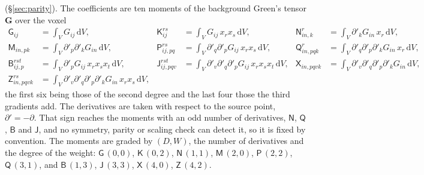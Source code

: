 \documentclass[11pt,a4paper]{article}
\newcommand{\bG}{\mathbf{G}}
\newcommand{\dd}{\mathrm{d}}
\begin{document}
(\S\ref{sec:parity}). The coefficients are ten moments of the background Green's tensor $\bG$ over
the voxel
\begin{equation}\label{eq:moments}
\begin{aligned}
\mathsf G_{ij}&=\int_V G_{ij}\,\dd V, &
\mathsf K^{rs}_{ij}&=\int_V G_{ij}\,x_rx_s\,\dd V, &
\mathsf N^{r}_{in,k}&=\int_V \partial'_kG_{in}\,x_r\,\dd V,\\
\mathsf M_{in,pk}&=\int_V \partial'_p\partial'_kG_{in}\,\dd V, &
\mathsf P^{rs}_{ij,pq}&=\int_V \partial'_q\partial'_pG_{ij}\,x_rx_s\,\dd V, &
\mathsf Q^{r}_{in,pqk}&=\int_V \partial'_q\partial'_p\partial'_kG_{in}\,x_r\,\dd V,\\
\mathsf B^{rst}_{ij,p}&=\int_V \partial'_pG_{ij}\,x_rx_sx_t\,\dd V, &
\mathsf J^{rst}_{ij,pqv}&=\int_V \partial'_v\partial'_q\partial'_pG_{ij}\,x_rx_sx_t\,\dd V, &
\mathsf X_{in,pqvk}&=\int_V \partial'_v\partial'_q\partial'_p\partial'_kG_{in}\,\dd V,\\
\mathsf Z^{rs}_{in,pqvk}&=\int_V \partial'_v\partial'_q\partial'_p\partial'_kG_{in}\,x_rx_s\,\dd V,
\end{aligned}
\end{equation}
the first six being those of the second degree and the last four those the third gradients add. The
derivatives are taken with respect to the source point, $\partial'=-\partial$. That sign reaches
the moments with an odd number of derivatives, $\mathsf N$, $\mathsf Q$, $\mathsf B$ and $\mathsf J$,
and no symmetry, parity or scaling check can detect it, so it is fixed by convention. The moments are
graded by $(D,W)$, the number of derivatives and the degree of the weight: $\mathsf G\,(0,0)$,
$\mathsf K\,(0,2)$, $\mathsf N\,(1,1)$, $\mathsf M\,(2,0)$, $\mathsf P\,(2,2)$, $\mathsf Q\,(3,1)$,
and $\mathsf B\,(1,3)$, $\mathsf J\,(3,3)$, $\mathsf X\,(4,0)$, $\mathsf Z\,(4,2)$.
\end{document}
